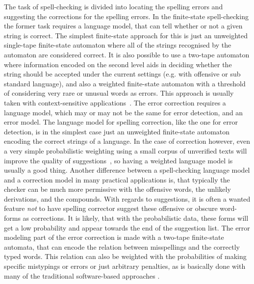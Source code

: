 \documentclass[a4paper,12pt]{article}
\begin{document}
The task of spell-checking is divided into locating the spelling errors and
suggesting the corrections for the spelling errors. In the finite-state
spell-checking the former task requires a language model, that can tell whether
or not a given string is correct. The simplest finite-state approach for this
is just an unweighted single-tape finite-state automaton where all of the
strings recognised by the automaton are considered correct. It is also possible
to use a two-tape automaton where information encoded on the second level aids
in deciding whether the string should be accepted under the current settings
(e.g.  with offensive or sub standard language), and also a weighted
finite-state automaton with a threshold of considering very rare or unusual
words as errors.  This approach is usually taken with context-sensitive
applications~\cite[]{otero/2007}. The error correction requires a language
model, which may or may not be the same for error detection, and an error
model.  The language model for spelling correction, like the one for error
detection, is in the simplest case just an unweighted finite-state automaton
encoding the correct strings of a language. In the case of correction however,
even a very simple probabilistic weighting using a small corpus of unverified
texts will improve the quality of suggestions~\cite[]{pirinen/2010/lrec}, so
having a weighted language model is usually a good thing. Another difference
between a spell-checking language model and a correction model in many
practical applications is, that typically the checker can be much more
permissive with the offensive words, the unlikely derivations, and the
compounds. With regards to suggestions, it is often a wanted feature \emph{not}
to have spelling corrector suggest these offensive or obscure word-forms as
corrections. It is likely, that with the probabilistic data, these forms will
get a low probability and appear towards the end of the suggestion list. The
error modeling part of the error correction is made with a two-tape
finite-state automata, that can encode the relation between misspellings and
the correctly typed words. This relation can also be weighted with the
probabilities of making specific mistypings or errors or just arbitrary
penalties, as is basically done with many of the traditional software-based
approaches \cite[such as][]{Hunspell/manual}.
\end{document}

